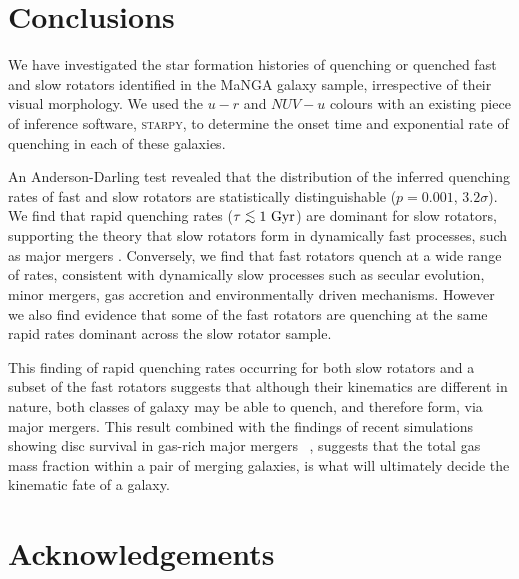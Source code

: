 \documentclass[useAMS,usenatbib]{mn2e}
\def\lesssim{\mathrel{\hbox{\rlap{\hbox{\lower3pt\hbox{$\sim$}}}\hbox{\raise2pt\hbox{$<$}}}}}
\begin{document}

\section{Conclusions}

We have investigated the star formation histories of quenching or quenched fast and slow rotators identified in the MaNGA galaxy sample, irrespective of their visual morphology. We used the $u-r$ and $NUV-u$ colours with an existing piece of inference software, \textsc{starpy}, to determine the onset time and exponential rate of quenching in each of these galaxies. 

An Anderson-Darling test revealed that the distribution of the inferred quenching rates of fast and slow rotators are statistically distinguishable ($p=0.001$, $3.2\sigma$). We find that rapid quenching rates ($\tau \lesssim 1~\rm{Gyr}$) are dominant for slow rotators, supporting the theory that slow rotators form in dynamically fast processes, such as major mergers \citep{bois10, duc11, naab14}. Conversely, we find that fast rotators quench at a wide range of rates, consistent with dynamically slow processes such as secular evolution, minor mergers, gas accretion and environmentally driven mechanisms. However we also find evidence that some of the fast rotators are quenching at the same rapid rates dominant across the slow rotator sample.

This finding of rapid quenching rates occurring for both slow rotators and a subset of the fast rotators suggests that although their kinematics are different in nature, both classes of galaxy may be able to quench, and therefore form, via major mergers. This result combined with the findings of recent simulations showing disc survival in gas-rich major mergers ~\citep{bois11, pontzen16, sparre16}, suggests that the total gas mass fraction within a pair of merging galaxies, is what will ultimately decide the kinematic fate of a galaxy. 
	
\section*{Acknowledgements}
\end{document}
